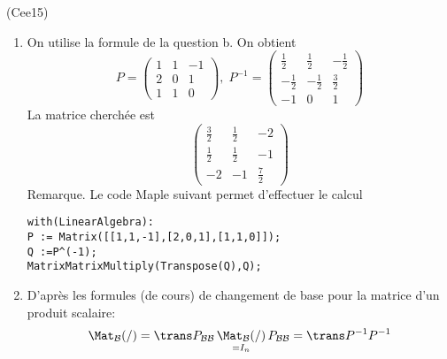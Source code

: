 \begin{tiny}(Cee15)\end{tiny}
\begin{enumerate}
 \item On utilise la formule de la question b. On obtient
\renewcommand{\arraystretch}{1.2}
\begin{displaymath}
 P=
\begin{pmatrix}
 1 & 1 & -1 \\ 2 & 0 & 1 \\ 1 & 1 & 0
\end{pmatrix}, \;
P^{-1}=
\begin{pmatrix}
 \frac{1}{2} & \frac{1}{2} & -\frac{1}{2} \\
 -\frac{1}{2} & -\frac{1}{2} & \frac{3}{2} \\
 -1 & 0 & 1
\end{pmatrix}
\end{displaymath}
La matrice cherchée est 
\begin{displaymath}
 \begin{pmatrix}
 \frac{3}{2} & \frac{1}{2} & -2 \\
\frac{1}{2} & \frac{1}{2} & -1 \\
-2 & -1 & \frac{7}{2}
 \end{pmatrix}
\end{displaymath}
Remarque. Le code Maple suivant permet d'effectuer le calcul
\begin{verbatim}
with(LinearAlgebra):
P := Matrix([[1,1,-1],[2,0,1],[1,1,0]]);
Q :=P^(-1);
MatrixMatrixMultiply(Transpose(Q),Q);
\end{verbatim}

 \item D'après les formules (de cours) de changement de base pour la matrice d'un produit scalaire:
\begin{displaymath}
 \Mat_{\mathcal{B}}(/) = \trans P_{\mathcal{B}\mathcal{B}}\, \underset{=I_n}{\Mat_{\mathcal{B}}(/)} \,P_{\mathcal{B}\mathcal{B}}
= \trans P ^{-1} P ^{-1}
\end{displaymath}


\end{enumerate}

